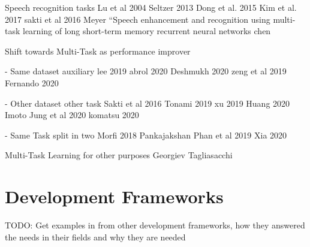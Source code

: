 Speech recognition tasks
Lu et al 2004
Seltzer 2013
Dong et al. 2015
Kim et al. 2017
sakti et al 2016
Meyer
“Speech enhancement
and recognition using multi-task learning of long short-term memory recurrent neural networks chen

\textbf{}

Shift towards Multi-Task as performance improver

- Same dataset auxiliary
lee 2019
abrol 2020
Deshmukh 2020
zeng et al 2019
Fernando 2020


- Other dataset other task
Sakti et al 2016
Tonami 2019
xu 2019
Huang 2020
Imoto
Jung et al 2020
komatsu 2020


- Same Task split in two
Morfi 2018
Pankajakshan
Phan et al 2019
Xia 2020


Multi-Task Learning for other purposes
Georgiev
Tagliasacchi




\section{Development Frameworks}
TODO: Get examples in from other development frameworks, how they answered the needs in their fields and why they are needed

